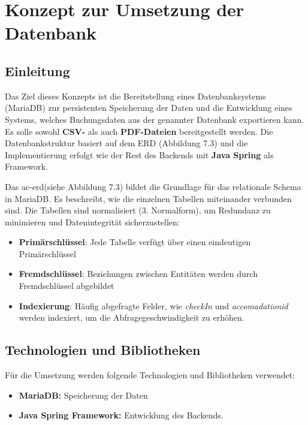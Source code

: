 \section{Konzept zur Umsetzung der Datenbank}
\subsection{Einleitung}
Das Ziel dieses Konzepts ist die Bereitstellung eines Datenbanksystems (MariaDB) zur persistenten Speicherung der Daten und die Entwicklung eines Systems, welches Buchungsdaten aus der genannter Datenbank  exportieren kann. Es solle sowohl \textbf{CSV-} als auch \textbf{PDF-Dateien} bereitgestellt werden. Die Datenbankstruktur basiert auf dem ERD (Abbildung 7.3) und die Implementierung erfolgt wie der Rest des Backends mit \textbf{Java Spring} als Framework.


\vspace{3mm}



\noindent Das \gls{ac-erd}(siehe Abbildung 7.3) bildet die Grundlage für das relationale Schema in MariaDB. Es beschreibt, wie die einzelnen Tabellen miteinander verbunden sind. Die Tabellen sind normalisiert (\gls{3. Normalform}), um Redundanz zu minimieren und Datenintegrität sicherzustellen: 

\begin{itemize}
	\item \textbf{Primärschlüssel}: Jede Tabelle verfügt über einen eindeutigen Primärschlüssel
	\item \textbf{Fremdschlüssel}: Beziehungen zwischen Entitäten werden durch Fremdschlüssel abgebildet
	\item \textbf{Indexierung}: Häufig abgefragte Felder, wie \textit{checkIn} und \textit{accomadationid} werden indexiert, um die Abfragegeschwindigkeit zu erhöhen.
\end{itemize}

\subsection{Technologien und Bibliotheken}
Für die Umsetzung werden folgende Technologien und Bibliotheken verwendet:
\begin{itemize}
	\item \textbf{MariaDB:} Speicherung der Daten
	\item \textbf{Java Spring Framework:} Entwicklung des Backends.
	
\end{itemize}

